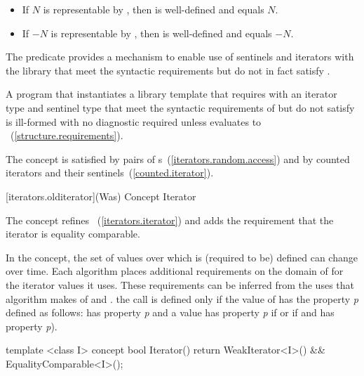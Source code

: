 \begin{addedblock}
{\begin{itemdescr}
\begin{itemize}
\item If $N$ is representable by ,
      then  is well-defined and equals $N$.

\item If $-N$ is representable by ,
      then  is well-defined and equals $-N$.
\end{itemize}
\end{itemdescr}

\pnum
The  predicate provides a mechanism to
enable use of sentinels and iterators with the library that meet the
syntactic requirements but do not in fact satisfy .

\pnum
\enternote A program that instantiates a library template that requires
 with an iterator type  and sentinel type
 that meet the syntactic requirements of 
but do not satisfy  is ill-formed with no diagnostic required
unless  evaluates to
~(\ref{structure.requirements}). \exitnote
} %

\pnum
\enternote The 
concept is satisfied by pairs of
s~(\ref{iterators.random.access}) and by
counted iterators and their sentinels~(\ref{counted.iterator}).\exitnote


{\color{oldclr}
[iterators.olditerator]{(Was) Concept Iterator}

\pnum
The  concept refines ~(\ref{iterators.iterator}) and adds
the requirement that the iterator is equality comparable.

\pnum
In the  concept, the set of values over which
\tcode{==} is (required to be) defined can change over time.
Each algorithm places additional requirements on the domain of
\tcode{==} for the iterator values it uses.
These requirements can be inferred from the uses that algorithm
makes of \tcode{==} and \tcode{!=}.
\enterexample
the call 
is defined only if the value of 
has the property \textit{p}
defined as follows:
 has property \textit{p}
and a value 
has property \textit{p}
if
or if
and
has property
\textit{p}).
\exitexample

\begin{itemdecl}
  template <class I>
  concept bool Iterator() {
    return WeakIterator<I>() &&
      EqualityComparable<I>();
  }
\end{itemdecl}
} %
\end{addedblock}

